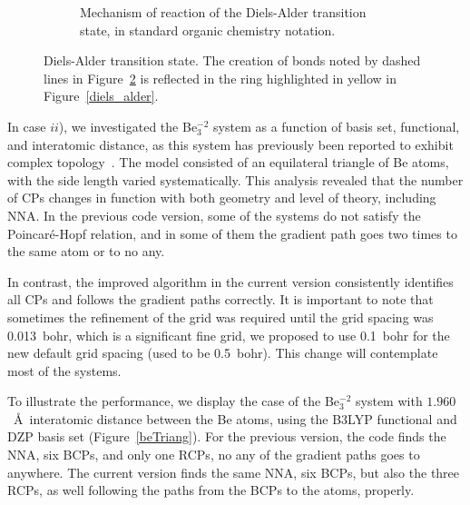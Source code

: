 \begin{figure}[h]
\begin{subfigure}[t]{0.34\textwidth}
    \caption{Mechanism of reaction of the Diels-Alder transition state, in
      standard organic chemistry notation.}
    \label{da_flechas}
  \end{subfigure}
  \caption{Diels-Alder transition state. The creation of bonds noted by dashed lines
    in Figure~\ref{da_flechas} is reflected in the ring highlighted in yellow
    in Figure~\ref{diels_alder}.}
\end{figure}

\newpage
In case $ii$), we investigated the Be$_3^{-2}$ system as a function of basis
set, functional, and interatomic distance, as this system has previously been
reported to exhibit complex topology~\cite{Goswami2015}. The model consisted of
an equilateral triangle of Be atoms, with the side length varied
systematically. This analysis revealed that the number of \glspl{CP} changes
in function with both geometry and level of theory, including NNA. In the
previous code version, some of the systems do not satisfy the Poincaré-Hopf
relation, and in some of them the gradient path goes two times to the same atom
or to no any.

In contrast, the improved algorithm in the current version consistently
identifies all \glspl{CP} and follows the gradient paths correctly. It is
important to note that sometimes the refinement of the grid was required until
the grid spacing was 0.013~bohr, which is a significant fine grid, we proposed
to use 0.1~bohr for the new default grid spacing (used to be 0.5~bohr). This
change will contemplate most of the systems.

To illustrate the performance, we display the case of the Be$_3^{-2}$ system
with $1.960$~\AA\ interatomic distance between the Be atoms, using the B3LYP
functional and DZP basis set (Figure~\ref{beTriang}). For the previous version,
the code finds the NNA, six \glspl{BCP}, and only one \glspl{RCP}, no any of
the gradient paths goes to anywhere. The current version finds the same NNA,
six \glspl{BCP}, but also the three \glspl{RCP}, as well following the paths
from the \glspl{BCP} to the atoms, properly.

